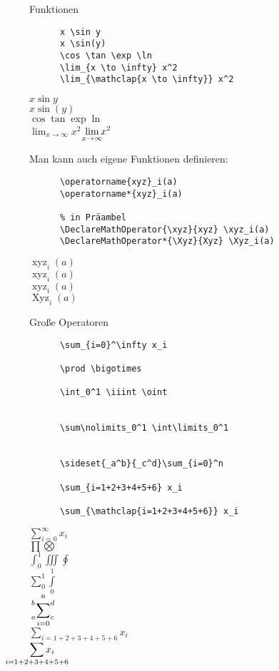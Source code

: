 \begin{frame}[fragile]{Funktionen}
  \begin{CodeExample}{0.70}
    \begin{lstlisting}
      x \sin y
      x \sin(y)
      \cos \tan \exp \ln
      \lim_{x \to \infty} x^2 
      \lim_{\mathclap{x \to \infty}} x^2
    \end{lstlisting}
  \CodeResult
    $x \sin y$ \\
    $x \sin(y)$ \\
    $\cos \tan \exp \ln$ \\
    $\displaystyle \lim_{x \to \infty} x^2$
    $\displaystyle \lim_{\mathclap{x \to \infty}} x^2$
  \end{CodeExample}
  \vspace{5pt}
  Man kann auch eigene Funktionen definieren:
  \vspace{-1em}
  \begin{CodeExample}{0.70}
    \begin{lstlisting}
      \operatorname{xyz}_i(a)
      \operatorname*{xyz}_i(a)

      % in Präambel
      \DeclareMathOperator{\xyz}{xyz} \xyz_i(a)
      \DeclareMathOperator*{\Xyz}{Xyz} \Xyz_i(a)
    \end{lstlisting}
  \CodeResult
    $\operatorname{xyz}_i(a)$ \\
    $\displaystyle \operatorname*{xyz}_i(a)$ \\[\baselineskip]
    $\operatorname{xyz}_i(a)$ \\
    $\displaystyle \operatorname*{Xyz}_i(a)$
  \end{CodeExample}
\end{frame}

\begin{frame}[fragile]{Große Operatoren}
  \begin{CodeExample}{0.70}
    \begin{lstlisting}
      \sum_{i=0}^\infty x_i

      \prod \bigotimes

      \int_0^1 \iiint \oint


      \sum\nolimits_0^1 \int\limits_0^1


      \sideset{_a^b}{_c^d}\sum_{i=0}^n

      \sum_{i=1+2+3+4+5+6} x_i

      \sum_{\mathclap{i=1+2+3+4+5+6}} x_i
    \end{lstlisting}
  \CodeResult
    $\displaystyle \sum_{i=0}^\infty x_i$ \\
    $\displaystyle \prod \bigotimes$ \\
    $\displaystyle \int_0^1 \iiint \oint$  \\
    $\displaystyle \sum\nolimits_0^1 \int\limits_0^1$ \\
    $\displaystyle \sideset{_a^b}{_c^d}\sum_{i=0}^n$ \\
    $\displaystyle \sum_{i=1+2+3+4+5+6} x_i$ \\
    \hspace*{0.75cm}$\displaystyle \sum_{\mathclap{i=1+2+3+4+5+6}} x_i$
  \end{CodeExample}
\end{frame}

